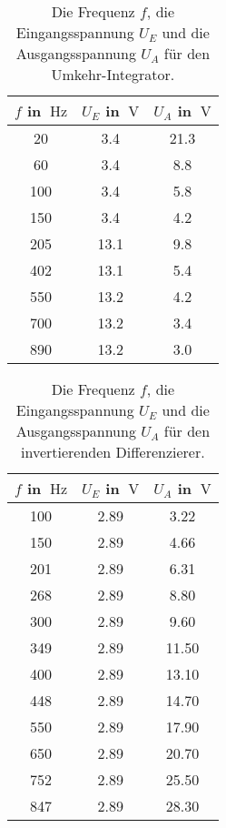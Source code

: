 \begin{table}
    \centering
    \begin{tabular}{c c c  }
        \toprule
        $f$ in $\qty{}{\hertz}$ & $U_E$ in $\qty{}{\V}$ & $U_A$ in $\qty{}{\V}$ \\
        \midrule   
        20  &    3.4  &   21.3 \\
        60  &    3.4  &   8.8 \\
        100 &    3.4  &   5.8 \\
        150 &    3.4  &   4.2 \\
        205 &    13.1 &   9.8 \\
        402 &    13.1 &   5.4 \\
        550 &    13.2 &   4.2 \\
        700 &    13.2 &   3.4 \\
        890 &    13.2 &   3.0 \\
        \bottomrule     
    \end{tabular}
    \caption{Die Frequenz $f$, die Eingangsspannung $U_E$ und die Ausgangsspannung $U_A$ für den 
    Umkehr-Integrator.}
    \label{tab:umint}
\end{table}
\begin{table}
    \centering
    \begin{tabular}{c c c  }
        \toprule
        $f$ in $\qty{}{\hertz}$ & $U_E$ in $\qty{}{\V}$ & $U_A$ in $\qty{}{\V}$ \\
        \midrule   
        100 &    2.89 &   3.22  \\
        150 &    2.89 &   4.66  \\
        201 &    2.89 &   6.31  \\
        268 &    2.89 &   8.80  \\
        300 &    2.89 &   9.60  \\
        349 &    2.89 &   11.50 \\
        400 &    2.89 &   13.10 \\
        448 &    2.89 &   14.70 \\
        550 &    2.89 &   17.90 \\
        650 &    2.89 &   20.70 \\
        752 &    2.89 &   25.50 \\
        847 &    2.89 &   28.30 \\
        \bottomrule     
    \end{tabular}
    \caption{Die Frequenz $f$, die Eingangsspannung $U_E$ und die Ausgangsspannung $U_A$ für den 
    invertierenden Differenzierer.}
    \label{tab:dif}
\end{table}